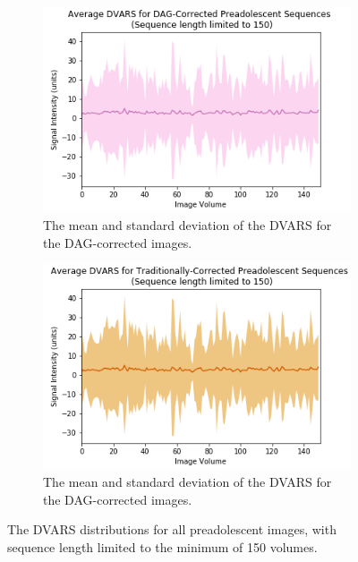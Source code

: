 \begin{figure}[t]
	\begin{subfigure}{0.45\textwidth}
		\centering
		\includegraphics[width=1\textwidth]{6/figures/pread-dag-dvars-150.png}
		\caption{The mean and standard deviation of the DVARS for the DAG-corrected images.}
	\end{subfigure}%
	\vspace{0.05\textwidth}
	\begin{subfigure}{0.45\textwidth}
		\centering
		\includegraphics[width=1\textwidth]{6/figures/pread-trad-dvars-150.png}
		\caption{The mean and standard deviation of the DVARS for the DAG-corrected images.}
	\end{subfigure}
\caption{The DVARS distributions for all preadolescent images, with sequence length limited to the minimum of 150 volumes.}
\label{fig:pread-dvars-150}
\end{figure}


